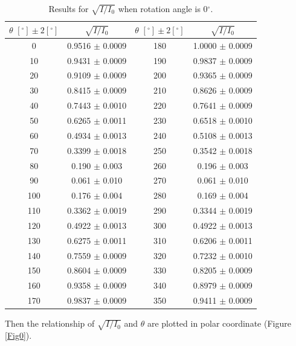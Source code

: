 \documentclass{article}
\begin{document}
\begin{table}[H]\centering
\begin{tabular}{cc||cc}
\toprule
$\theta\,\,[^\circ] \pm 2[^\circ]$ & $\sqrt{I/I_0}$ & $\theta\,\,[^\circ] \pm 2[^\circ]$ & $\sqrt{I/I_0}$\\
\midrule
    0     & 0.9516   $\pm$ 0.0009  & 180   & 1.0000   $\pm$ 0.0009  \\
    10    & 0.9431   $\pm$ 0.0009  & 190   & 0.9837   $\pm$ 0.0009  \\
    20    & 0.9109   $\pm$ 0.0009  & 200   & 0.9365   $\pm$ 0.0009  \\
    30    & 0.8415   $\pm$ 0.0009  & 210   & 0.8626   $\pm$ 0.0009  \\
    40    & 0.7443   $\pm$ 0.0010  & 220   & 0.7641   $\pm$ 0.0009  \\
    50    & 0.6265   $\pm$ 0.0011  & 230   & 0.6518   $\pm$ 0.0010  \\
    60    & 0.4934   $\pm$ 0.0013  & 240   & 0.5108   $\pm$ 0.0013  \\
    70    & 0.3399   $\pm$ 0.0018  & 250   & 0.3542   $\pm$ 0.0018  \\
    80    & 0.190    $\pm$ 0.003   & 260   & 0.196    $\pm$ 0.003   \\
    90    & 0.061    $\pm$ 0.010   & 270   & 0.061    $\pm$ 0.010   \\
    100   & 0.176    $\pm$ 0.004   & 280   & 0.169    $\pm$ 0.004   \\
    110   & 0.3362   $\pm$ 0.0019  & 290   & 0.3344   $\pm$ 0.0019  \\
    120   & 0.4922   $\pm$ 0.0013  & 300   & 0.4922   $\pm$ 0.0013  \\
    130   & 0.6275   $\pm$ 0.0011  & 310   & 0.6206   $\pm$ 0.0011  \\
    140   & 0.7559   $\pm$ 0.0009  & 320   & 0.7232   $\pm$ 0.0010  \\
    150   & 0.8604   $\pm$ 0.0009  & 330   & 0.8205   $\pm$ 0.0009  \\
    160   & 0.9358   $\pm$ 0.0009  & 340   & 0.8979   $\pm$ 0.0009  \\
    170   & 0.9837   $\pm$ 0.0009  & 350   & 0.9411   $\pm$ 0.0009  \\
\bottomrule
\end{tabular}
\caption{Results for $\sqrt{I/I_0}$ when rotation angle is 0$^\circ$.}\label{TableSqrt}
\end{table}

Then the relationship of $\sqrt{I/I_0}$ and $\theta$ are plotted in polar coordinate (Figure \ref{Fig0}).
\end{document}
